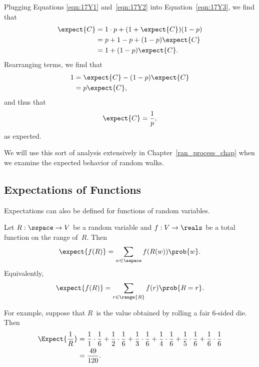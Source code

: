 Plugging Equations \ref{eqn:17Y1} and~\ref{eqn:17Y2} into
Equation~\ref{eqn:17Y3}, we find that
\begin{align*}
\expect{C}
    &= 1 \cdot p + (1 + \expect{C}) (1 - p) \\
    &= p + 1 - p + (1 - p) \expect{C} \\
    &= 1 + (1 - p) \expect{C}.
\end{align*}
Rearranging terms, we find that
\begin{align*}
    1   &= \expect{C} - (1 - p) \expect{C} \\
        &= p \expect{C},
\end{align*}
and thus that
\begin{equation*}
    \expect{C} = \frac{1}{p},
\end{equation*}
as expected.

We will use this sort of analysis extensively in
Chapter~\ref{ran_process_chap} when we examine the expected behavior
of random walks.

\subsection{Expectations of Functions}

Expectations can also be defined for functions of random variables.

\begin{definition}\label{def:exp_func}
Let $R: \sspace \to V$ be a random variable and $f: V \to \reals$ be a
total function on the range of~$R$.  Then
\begin{equation}\label{eqn:17P8}
    \expect{f(R)} = \sum_{w \in \sspace} f(R(w)) \prob{w}.
\end{equation}
Equivalently,
\begin{equation}\label{eqn:17P9}
    \expect{f(R)} = \sum_{r \in \range{R}} f(r) \prob{R = r}.
\end{equation}
\end{definition}

For example, suppose that $R$~is the value obtained by rolling a fair
6-sided die.  Then
\begin{align*}
\Expect{\frac{1}{R}}
    &= \frac{1}{1} \cdot \frac{1}{6}
     + \frac{1}{2} \cdot \frac{1}{6}
     + \frac{1}{3} \cdot \frac{1}{6}
     + \frac{1}{4} \cdot \frac{1}{6}
     + \frac{1}{5} \cdot \frac{1}{6}
     + \frac{1}{6} \cdot \frac{1}{6} \\
    &= \frac{49}{120}.
\end{align*}

